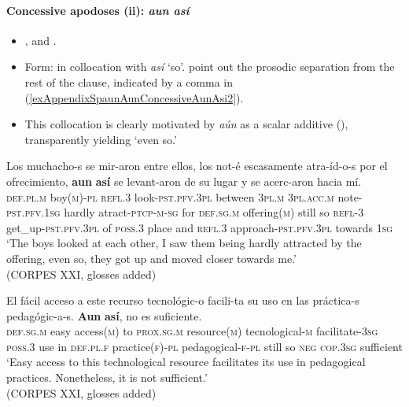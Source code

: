 \paragraph{Concessive apodoses (ii): \textit{aun así}}
\label{appendixSpanishAunConcessiveAunAsi}
\begin{itemize}
	\item \textcite[s.v. \textit{aun así}]{DPDE}, \textcite[55]{FuentesRodriguez2018} and \textcite[47.16q]{RAEGramatica}.
	\item Form: in collocation with \textit{así} \lq so'. \textcite[s.v. \textit{aun así}]{DPDE} point out the prosodic separation from the rest of the clause, indicated by a comma in (\ref{exAppendixSpaunAunConcessiveAunAsi2}).
	\item This collocation is clearly motivated by \textit{aún} as a scalar additive (), transparently yielding \lq even so.'
\end{itemize}
\largerpage
\begin{exe}
	\ex\label{exAppendixSpaunAunConcessiveAunAsi1}
	\gll Los muchacho-s se mir-aron entre ellos, los not-é escasamente atra-íd-o-s por el ofrecimiento, \textbf{aun} \textbf{así} se levant-aron de su lugar y se acerc-aron hacia mí.\\
	\textsc{def}.\textsc{pl}.\textsc{m} boy(\textsc{m})-\textsc{pl} \textsc{refl}.3 look-\textsc{pst}.\textsc{pfv}.3\textsc{pl} between 3\textsc{pl}.\textsc{m} 3\textsc{pl}.\textsc{acc}.\textsc{m} note-\textsc{pst}.\textsc{pfv}.1\textsc{sg} hardly atract-\textsc{ptcp}-\textsc{m}-\textsc{sg} for \textsc{def}.\textsc{sg}.\textsc{m} offering(\textsc{m}) still so \textsc{refl}-3 get\_up-\textsc{pst}.\textsc{pfv}.3\textsc{pl} of \textsc{poss}.3 place and \textsc{refl}.3 approach-\textsc{pst}.\textsc{pfv}.3\textsc{pl} towards 1\textsc{sg}\\
	\glt \lq The boys looked at each other, I saw them being hardly attracted by the offering, even so, they got up and moved closer towards me.'
	\\(CORPES XXI, glosses added)
	
	\ex\label{exAppendixSpaunAunConcessiveAunAsi2}
	\gll El fácil acceso a este recurso tecnológic-o facili-ta su uso en las práctica-s pedagógic-a-s. \textbf{Aun} \textbf{así}, no es suficiente.\\
	\textsc{def}.\textsc{sg}.\textsc{m} easy access(\textsc{m}) to \textsc{prox}.\textsc{sg}.\textsc{m} resource(\textsc{m}) tecnological-\textsc{m} facilitate-3\textsc{sg} \textsc{poss}.3 use in \textsc{def}.\textsc{pl}.\textsc{f} practice(\textsc{f})-\textsc{pl} pedagogical-\textsc{f}-\textsc{pl} still so \textsc{neg} \textsc{cop}.3\textsc{sg} sufficient\\
	\glt \lq Easy access to this technological resource facilitates its use in pedagogical practices. Nonetheless, it is not sufficient.'
	\\(CORPES XXI, glosses added)
\end{exe}

